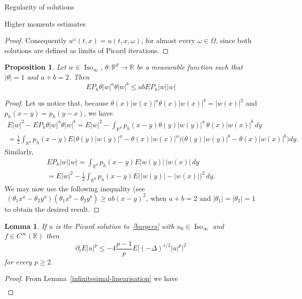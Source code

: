 \documentclass[a4paper,10pt,fleqn]{amsart}
\newtheorem{lemma}[theorem]{Lemma}
\newtheorem{proposition}[theorem]{Proposition}
\theoremstyle{remark}
\theoremstyle{definition}
\DeclareMathOperator{\Iso}{Iso}
\newcommand{\dt} {\partial_t}
\newcommand{\X} {{\mathbb{R}^d}}
\newcommand{\R} {\mathbb{R}}
\renewcommand{\=} {\overset{d}{=}}
\begin{document}
\begin{section}{Regularity of solutions}
\begin{subsection}{Higher moments estimates}
\begin{proof}
    Consequently
    $u^\omega(t,x) = u(t,x,\omega)$, for almost every $\omega\in\Omega$, since both solutions are defined as limits of
    Picard iterations.
    \end{proof}
    \begin{proposition}\label{liskevich-semenov}
     Let $w\in\Iso_\infty$, $\theta:\X\to\R$ be a measurable function such that $|\theta|=1$ and $a+b=2$. Then
     \begin{equation*}
      EP_h\theta |w|^a \theta |w|^b \leq abEP_h|w||w|
     \end{equation*}
    \end{proposition}
    \begin{proof}
     Let us notice that, because $\theta(x)|w(x)|^a\theta(x)|w(x)|^b = |w(x)|^2$ and
     $p_h(x-y)=p_h(y-x)$, we have
     \begin{multline*}
	E|w|^2 - EP_h\theta |w|^a\theta |w|^b 
	= E|w|^2 - \int_\X p_h(x-y)\theta(y)|w(y)|^a\,\theta(x)|w(x)|^b\,dy\\
	 =\frac{1}{2}\int_\X\!\!\!\! p_h(x-y)E\big(\theta(y)|w(y)|^a\!-\theta(x)|w(x)|^a\big)\!
					   \big(\theta(y)|w(y)|^b\!-\theta(x)|w(x)|^b\big)dy.
     \end{multline*}
     Similarly,
     \begin{multline*}
	EP_h|w||w|
	= \int_\X p_h(x-y)E|w(y)|\,|w(x)|\,dy\\
	= E|w|^2
	- \frac{1}{2}\int_\X p_h(x-y)E\big(|w(y)|-|w(x)|\big)^2\,dy.
     \end{multline*}
     We may now use the following inequality (see \cite[Lemma II.5.5]{MR1218884}
     \begin{equation*}
      (\theta_1x^a-\theta_2y^a)(\theta_1x^b-\theta_2y^b)\geq ab(x-y)^2,\ \text{when $a+b=2$ and $|\theta_1|=|\theta_2|=1$}
     \end{equation*}
     to obtain the desired result.
    \end{proof}
    \begin{lemma}\label{cut-off-reg}
    If $u$ is the Picard solution to~\eqref{burgers} with $u_0\in\Iso_\infty$ and $f\in C^\infty(\R)$ then
     \begin{equation*}
      \dt E|u|^p \leq -4\frac{p-1}{p}E\big|(-\Delta)^{s/2}|u|^{p}\big|^2
     \end{equation*}
      for every $p\geq2$.
    \end{lemma}
    \begin{proof}
     From Lemma~\ref{infinitesimal-linearisation} we have
     \begin{multline*}

\end{multline*}
\end{proof}
\end{subsection}
\end{section}
\end{document}
